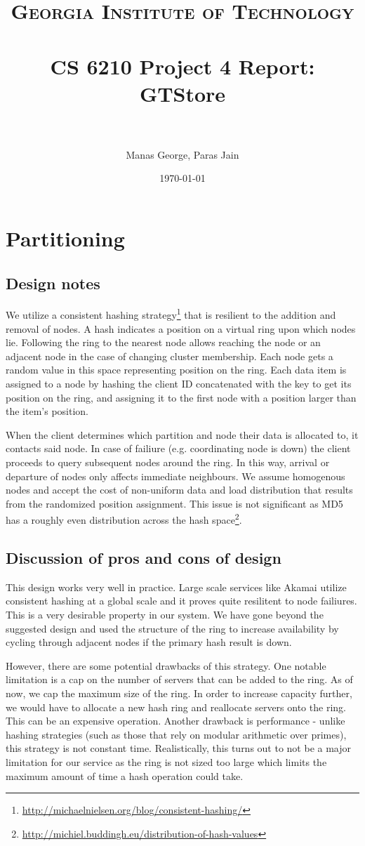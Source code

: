 \documentclass[paper=a4,fontsize=11pt]{report} %
\title{	
\normalfont \normalsize 
\textsc{Georgia Institute of Technology} \\ [25pt] %
\horrule{0.5pt} \\[0.4cm] %
\huge CS 6210 Project 4 Report: GTStore \\ %
\horrule{2pt} \\[0.5cm] %
}
\author{Manas George, Paras Jain} %
\date{\normalsize\today} %
\numberwithin{equation}{section} %
\numberwithin{figure}{section} %
\numberwithin{table}{section} %
\begin{document}
\maketitle %

\section{Partitioning}
\label{partitioning}
\subsection{Design notes}
We utilize a consistent hashing strategy\footnote{\url{http://michaelnielsen.org/blog/consistent-hashing/}} that is resilient to the addition and removal of nodes. A hash indicates a position on a virtual ring upon which nodes lie. Following the ring to the nearest node allows reaching the node or an adjacent node in the case of changing cluster membership. Each node gets a random value in this space representing position on the ring. Each data item is assigned to a node by hashing the client ID concatenated with the key to get its position on the ring, and assigning it to the first node with a position larger than the item's position.

When the client determines which partition and node their data is allocated to, it contacts said node. In case of failiure (e.g. coordinating node is down) the client proceeds to query subsequent nodes around the ring. In this way, arrival or departure of nodes only affects immediate neighbours. We assume homogenous nodes and accept the cost of non-uniform data and load distribution that results from the randomized position assignment. This issue is not significant as MD5 has a roughly even distribution across the hash space\footnote{\url{http://michiel.buddingh.eu/distribution-of-hash-values}}.

\subsection{Discussion of pros and cons of design}
This design works very well in practice. Large scale services like Akamai utilize consistent hashing at a global scale and it proves quite resilitent to node failiures. This is a very desirable property in our system. We have gone beyond the suggested design and used the structure of the ring to increase availability by cycling through adjacent nodes if the primary hash result is down.  

However, there are some potential drawbacks of this strategy. One notable limitation is a cap on the number of servers that can be added to the ring. As of now, we cap the maximum size of the ring. In order to increase capacity further, we would have to allocate a new hash ring and reallocate servers onto the ring. This can be an expensive operation. Another drawback is performance - unlike hashing strategies (such as those that rely on modular arithmetic over primes), this strategy is not constant time. Realistically, this turns out to not be a major limitation for our service as the ring is not sized too large which limits the maximum amount of time a hash operation could take.
\end{document}
